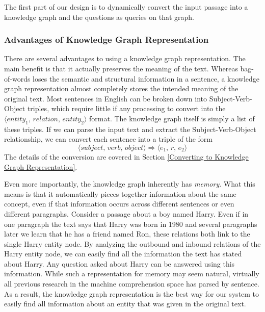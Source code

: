 \documentclass[pageno]{final_paper}
\begin{document}
The first part of our design is to dynamically convert the input passage into a
knowledge graph and the questions as queries on that graph. \\

\subsubsection{Advantages of Knowledge Graph Representation}
\label{Advantages of Knowledge Graph Representation}

There are several advantages to using a knowledge graph representation. The main
benefit is that it actually preserves the meaning of the text. Whereas
bag-of-words loses the semantic and structural information in a sentence, a
knowledge graph representation almost completely stores the intended meaning of
the original text. Most sentences in English can be broken down into
Subject-Verb-Object triples, which require little if any processing to convert
into the $\langle \textit{entity}_1, \, \textit{relation}, \, \textit{entity}_2
\rangle$ format. The knowledge graph itself is simply a list of these triples.
If we can parse the input text and extract the Subject-Verb-Object relationship,
we can convert each sentence into a triple of the form
$$\langle \textit{subject}, \, \textit{verb}, \, \textit{object} \rangle
\Rightarrow \langle e_1, \, r, \, e_2 \rangle$$
The details of the conversion are covered in Section \ref{Converting to
Knowledge Graph Representation}.

Even more importantly, the knowledge graph inherently has \textit{memory}. What
this means is that it automatically pieces together information about the same
concept, even if that information occurs across different sentences or even
different paragraphs. Consider a passage about a boy named Harry. Even if in one
paragraph the text says that Harry was born in 1980 and several paragraphs later
we learn that he has a friend named Ron, these relations both link to the single
Harry entity node. By analyzing the outbound and inbound relations of the Harry
entity node, we can easily find all the information the text has stated about
Harry. Any question asked about Harry can be answered using this information.
While such a representation for memory may seem natural, virtually all previous
research in the machine comprehension space has parsed by sentence. As a result,
the knowledge graph representation is the best way for our system to easily find
all information about an entity that was given in the original text.
\end{document}
